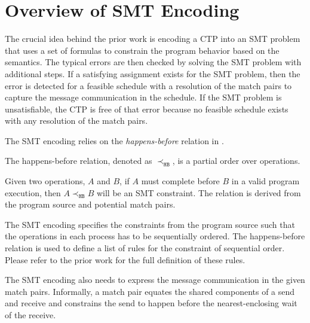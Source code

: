 \section{Overview of SMT Encoding}



The crucial idea behind the prior work is encoding a CTP into an SMT problem that uses a set of formulas to constrain the program behavior based on the semantics. 
The typical errors are then checked by solving the SMT problem with additional steps. If a satisfying assignment exists for the SMT problem, then the error is detected for a feasible schedule with a resolution of the match pairs to capture the message communication in the schedule. If the SMT problem is unsatisfiable, the CTP is free of that error because no feasible schedule exists with any resolution of the match pairs.


The SMT encoding relies on the \textit{happens-before} relation in .
\begin{definition}
The happens-before relation, denoted as $\prec_{\mathtt{HB}}$, is a partial order over operations.
\label{def:hb}
\end{definition}
Given two operations, $A$ and $B$, if $A$ must complete before $B$ in a valid program execution, then $A \prec_{\mathtt{HB}} B$ will be an SMT constraint. 
The relation is derived from the program source and potential match pairs. 

The SMT encoding specifies the constraints from the program source such that the operations in each process has to be sequentially ordered. The happens-before relation is used to define a list of rules for the constraint of sequential order. Please refer to the prior work \cite{DBLP:conf/kbse/HuangMM13,HuangNFM15} for the full definition of these rules. 

The SMT encoding also needs to express the message communication in the given match pairs.
Informally, a match pair equates the shared components of a send and receive and constrains the send to happen before the nearest-enclosing wait of the receive. 

